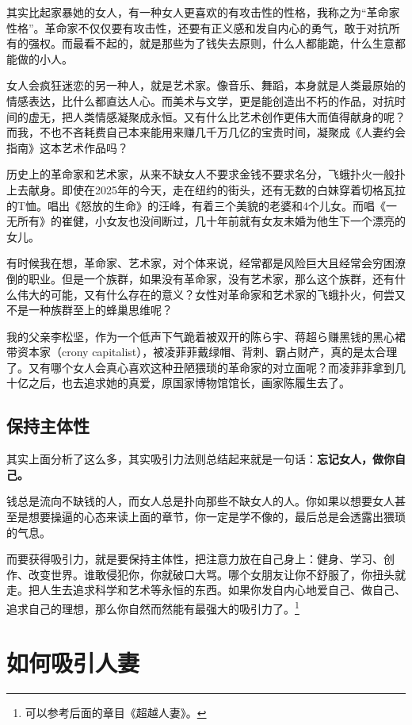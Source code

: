 其实比起家暴她的女人，有一种女人更喜欢的有攻击性的性格，我称之为``革命家性格''。革命家不仅仅要有攻击性，还要有正义感和发自内心的勇气，敢于对抗所有的强权。而最看不起的，就是那些为了钱失去原则，什么人都能跪，什么生意都能做的小人。

女人会疯狂迷恋的另一种人，就是艺术家。像音乐、舞蹈，本身就是人类最原始的情感表达，比什么都直达人心。而美术与文学，更是能创造出不朽的作品，对抗时间的虚无，把人类情感凝聚成永恒。又有什么比艺术创作更伟大而值得献身的呢？而我，不也不吝耗费自己本来能用来赚几千万几亿的宝贵时间，凝聚成《人妻约会指南》这本艺术作品吗？

历史上的革命家和艺术家，从来不缺女人不要求金钱不要求名分，飞蛾扑火一般扑上去献身。即使在2025年的今天，走在纽约的街头，还有无数的白妹穿着切格瓦拉的T恤。唱出《怒放的生命》的汪峰，有着三个美貌的老婆和4个儿女。而唱《一无所有》的崔健，小女友也没间断过，几十年前就有女友未婚为他生下一个漂亮的女儿。

有时候我在想，革命家、艺术家，对个体来说，经常都是风险巨大且经常会穷困潦倒的职业。但是一个族群，如果没有革命家，没有艺术家，那么这个族群，还有什么伟大的可能，又有什么存在的意义？女性对革命家和艺术家的飞蛾扑火，何尝又不是一种族群至上的蜂巢思维呢？

我的父亲李松坚，作为一个低声下气跪着被双开的陈ら宇、蒋超ら赚黑钱的黑心裙带资本家（crony capitalist），被凌菲菲戴绿帽、背刺、霸占财产，真的是太合理了。又有哪个女人会真心喜欢这种丑陋猥琐的革命家的对立面呢？而凌菲菲拿到几十亿之后，也去追求她的真爱，原国家博物馆馆长，画家陈履生去了。

\subsection{保持主体性}

其实上面分析了这么多，其实吸引力法则总结起来就是一句话：\textbf{忘记女人，做你自己。}

钱总是流向不缺钱的人，而女人总是扑向那些不缺女人的人。你如果以想要女人甚至是想要操逼的心态来读上面的章节，你一定是学不像的，最后总是会透露出猥琐的气息。

而要获得吸引力，就是要保持主体性，把注意力放在自己身上：健身、学习、创作、改变世界。谁敢侵犯你，你就破口大骂。哪个女朋友让你不舒服了，你扭头就走。把人生去追求科学和艺术等永恒的东西。如果你发自内心地爱自己、做自己、追求自己的理想，那么你自然而然能有最强大的吸引力了。\footnote{可以参考后面的章目《超越人妻》。}

\section{如何吸引人妻}

